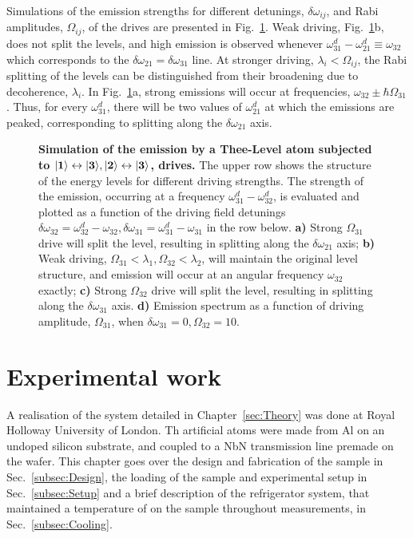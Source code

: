   Simulations of the emission strengths for different detunings, $ \delta\omega_{ij} $, and Rabi amplitudes, $ \Omega_{ij} $, of the drives are presented in Fig.~\ref{theTwoDrive}. Weak driving, Fig.~\ref{theTwoDrive}b, does not split the levels, and high emission is observed whenever $  \omega_{31}^{d} - \omega_{21}^{d} \equiv \omega_{32} $ which corresponds to the $ \delta\omega_{21} = \delta\omega_{31} $ line. At stronger driving, $ \lambda_i<\Omega_{ij} $, the Rabi splitting of the levels can be distinguished from their broadening due to decoherence, $ \lambda_i $. In Fig.~\ref{theTwoDrive}a, strong \ra{} emissions will occur at frequencies, $ \omega_{32}\pm\hbar\Omega_{31} $. Thus, for every $ \omega_{31}^{d} $, there will be two values of $ \omega_{21}^{d} $ at which the \ra{} emissions are peaked, corresponding to splitting along the $ \delta\omega_{21} $ axis.
  
  \begin{figure}
	  	\caption{\textbf{Simulation of the emission by a Thee-Level atom subjected to $ \mathbf{\ket{1}\leftrightarrow\ket{3}}, \mathbf{\ket{2}\leftrightarrow\ket{3}} $, drives.} The upper row shows the structure of the energy levels for different driving strengths. The strength of the \ra{} emission, occurring at a frequency $ \omega_{31}^{d} - \omega_{32}^{d} $, is evaluated and plotted as a function of the driving field detunings $ \delta\omega_{32} = \omega_{32}^{d}-\omega_{32}, \delta\omega_{31} = \omega_{31}^{d}-\omega_{31} $ in the row below. \textbf{a)} Strong $ \Omega_{31} $ drive will split the  level, resulting in splitting along the $ \delta\omega_{21} $ axis; \textbf{b)} Weak driving, $ \Omega_{31}<\lambda_1, \Omega_{32} < \lambda_2 $, will maintain the original level structure, and emission will occur at an angular frequency $ \omega_{32} $ exactly; \textbf{c)} Strong $ \Omega_{32} $ drive will split the  level, resulting in splitting along the $ \delta\omega_{31} $ axis. \textbf{d)} Emission spectrum as a function of driving amplitude, $ \Omega_{31} $, when $ \delta\omega_{31}=0, \Omega_{32}=10 $.}
	  	\label{theTwoDrive}
  \end{figure}
  \newpage
\section{Experimental work\label{sec:ExperimentalWork}}
 A realisation of the system detailed in Chapter~\ref{sec:Theory} was done at Royal Holloway University of London. Th artificial atoms were made from Al on an undoped silicon substrate, and coupled to a NbN transmission line premade on the wafer. This chapter goes over the design and fabrication of the sample in Sec.~\ref{subsec:Design}, the loading of the sample and experimental setup in Sec.~\ref{subsec:Setup} and a brief description of the refrigerator system, that maintained a temperature of  on the sample throughout measurements, in Sec.~\ref{subsec:Cooling}.
 
